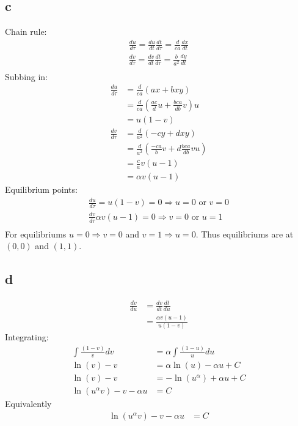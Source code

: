 \documentclass{unswmaths}
\begin{document}
\subsection*{c}
    Chain rule:
    \begin{align*}
        \frac{du}{d\tau} = \frac{du}{dt} \frac{dt}{d\tau} = \frac{d}{ca}\frac{dx}{dt} \\
        \frac{dv}{d\tau} = \frac{dv}{dt} \frac{dt}{d\tau} = \frac{b}{a^2} \frac{dy}{dt} \\
    \end{align*}
    Subbing in:
    \begin{align*}
        \frac{du}{d\tau} &= \frac{d}{ca} \left( ax + bxy \right) \\
            &= \frac{d}{ca} \left( \frac{ac}{d} u + \frac{bca}{db} v\right)u \\
            &= u(1-v) \\
        \frac{dv}{d\tau} &= \frac{d}{a^2} \left( -cy + dxy \right) \\
            &= \frac{d}{a^2} \left( \frac{-ca}{b} v + d\frac{bca}{db} vu\right) \\
            &= \frac{c}{a} v\left(u - 1\right) \\
            &= \alpha v(u - 1)
    \end{align*}
    Equilibrium points:
    \begin{align*}
        \frac{du}{d\tau} = u(1-v) = 0 \Longrightarrow  u = 0 \text{ or } v = 0 \\
        \frac{dv}{d\tau} \alpha v(u-1) = 0 \Longrightarrow v = 0 \text{ or } u = 1 \\
    \end{align*}
    For equilibriums $ u = 0 \Longrightarrow v = 0 $ and $ v = 1 \Longrightarrow u = 0 $.
    Thus equilibriums are at $ (0,0) $ and $ (1,1) $.
\subsection*{d}
    \begin{align*}
        \frac{dv}{du} &= \frac{dv}{dt} \frac{dt}{du} \\
            &= \frac{\alpha v(u-1)}{u(1-v)}
    \end{align*}
    Integrating:
    \begin{align*}
        \int \frac{(1-v)}{v}dv &= \alpha \int \frac{(1-u)}{u} du \\
        \ln(v) - v &= \alpha \ln(u) - \alpha u + C \\
        \ln(v) - v &= -\ln(u^\alpha) + \alpha u  + C \\
        \ln(u^\alpha v) - v -\alpha u &= C
    \end{align*}
    Equivalently
    \begin{align*}
        \ln(u^\alpha v) - v -\alpha u &= C
    \end{align*}
\end{document}

